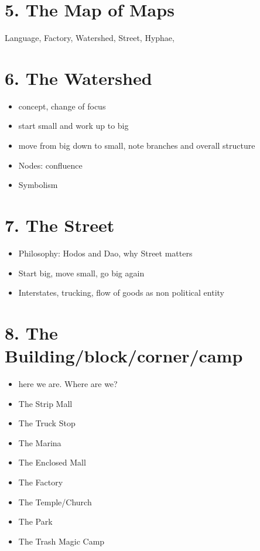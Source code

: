 \documentclass[11pt]{article}
\begin{document}
\section{5. The Map of Maps}


Language, Factory, Watershed, Street, Hyphae, 



\section{6. The Watershed}
\begin{itemize}

\item
concept, change of focus
\item
start small and work up to big
\item
move from big down to small, note branches and overall structure
\item
Nodes: confluence
\item
Symbolism
\end{itemize}

\section{7. The Street}
\begin{itemize}

\item
Philosophy: Hodos and Dao, why Street matters
\item
Start big, move small, go big again
\item
Interstates, trucking, flow of goods as non political entity
\end{itemize}

\section{8. The Building/block/corner/camp}
\begin{itemize}

\item
here we are.  Where are we?
\item
The Strip Mall
\item
The Truck Stop
\item
The Marina
\item
The Enclosed Mall
\item
The Factory
\item
The Temple/Church
\item
The Park
\item
The Trash Magic Camp
\end{itemize}
\end{document}
